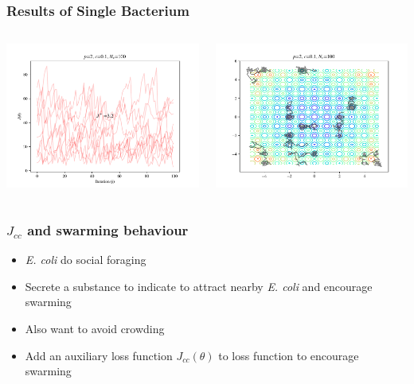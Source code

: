 \documentclass{beamer}
\begin{document}
\begin{frame}
\frametitle{Results of Single Bacterium}
\begin{columns}[T]
    \begin{center}
      \includegraphics[scale=0.35]{assets/rastrigin_J}
    \end{center}
  \begin{center}
    \includegraphics[scale=0.35]{assets/rastrigin_theta}
  \end{center}
\end{columns}
\end{frame}

\begin{frame}
\frametitle{$J_{cc}$ and swarming behaviour}
\begin{itemize}
  \item<1-> \textit{E. coli} do social foraging
  \item<2-> Secrete a substance to indicate to attract nearby \textit{E. coli} and encourage swarming
  \item<3-> Also want to avoid crowding
  \item<4-> Add an auxiliary loss function $J_{cc}(\theta)$ to loss function to encourage swarming
\end{itemize}
\end{frame}
\end{document}
